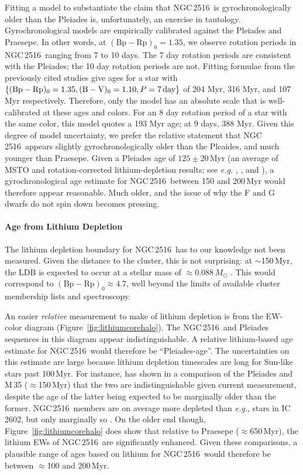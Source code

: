 \documentclass[12pt,twocolumn,tighten]{aastex63}
\newcommand{\cn}{NGC\,2516} %
\newcommand{\bpmrp}{(\mathrm{Bp}-\mathrm{Rp})_0}
\begin{document}
Fitting a model to substantiate the claim that \cn\ is
gyrochronologically older than the Pleiades \citep[{\it e.g.}, any
of][]{mamajek_improved_2008,angus_toward_2019,spada_competing_2020}
is, unfortunately, an exercise in tautology.  Gyrochronological models
are empirically calibrated against the Pleiades and Praesepe.  In
other words, at $\bpmrp=1.35$, we observe rotation periods in \cn\
ranging from 7 to 10 days.  The 7 day rotation periods are consistent
with the Pleiades; the 10 day rotation periods are not.  Fitting
formulae from the previously cited studies give ages for a star with
$\{\bpmrp=1.35, (\mathrm{B}-\mathrm{V})_0=1.10, P=7\,{\rm day}\}$ of
204 Myr, 316 Myr, and 107 Myr respectively.  Therefore, only the
\citet{spada_competing_2020} model has an absolute scale that is
well-calibrated at these ages and colors.  For an 8 day rotation
period of a star with the same color, this model quotes a 193 Myr age;
at 9 days, 388 Myr.  Given this degree of model uncertainty, we prefer
the relative statement that \cn\ appears slightly gyrochronologically
older than the Pleaides, and much younger than Praesepe.  Given a
Pleiades age of $125\pm20$\,Myr (an average of MSTO and
rotation-corrected lithium-depletion results; see {\it e.g.}
\citealt{stauffer_keck_1998}, \citealt{soderblom_ages_2014}, and
\citealt{cummings_2018}), a gyrochronological age estimate for \cn\
between 150 and 200\,Myr would therefore appear reasonable.  Much
older, and the issue of why the F and G dwarfs do not spin down
becomes pressing.

\paragraph{Age from Lithium Depletion}
The lithium depletion boundary for \cn\ has to our knowledge not been
measured.  Given the distance to the cluster, this is not surprising:
at $\sim$150\,Myr, the LDB is expected to occur at a stellar mass of
$\approx$0.088\,$M_\odot$ \citep{soderblom_ages_2014}.  This would
correspond to $\bpmrp\approx4.7$, well beyond the limits of available
cluster membership lists and spectroscopy.

An easier {\it relative} measurement to make of lithium depletion is
from the EW-color diagram (Figure~\ref{fig:lithiumcorehalo}).  The
\cn\ and Pleiades sequences in this diagram appear indistinguishable.
A relative lithium-based age estimate for \cn\ would therefore be
``Pleiades-age''.  The uncertainties on this estimate are large
because lithium depletion timescales are long for Sun-like stars past
100\,Myr.  For instance, \citet{jeffries_m35_li_2020} has shown in a
comparison of the Pleiades and M\,35 ($\approx$150\,Myr) that the two
are indistinguishable given current measurement, despite the age of
the latter being expected to be marginally older than the former.
\cn\ members are on average more depleted than {\it e.g.}, stars in
IC\,2602, but only marginally so \citep{soderblom_ages_2014}.  On the
older end though, Figure~\ref{fig:lithiumcorehalo} does show that
relative to Praesepe ($\approx$650\,Myr), the lithium EWs of \cn\ are
significantly enhanced.  Given these comparisons, a plausible range of
ages based on lithium for \cn\ would therefore be between $\approx$100
and 200\,Myr.
\end{document}
